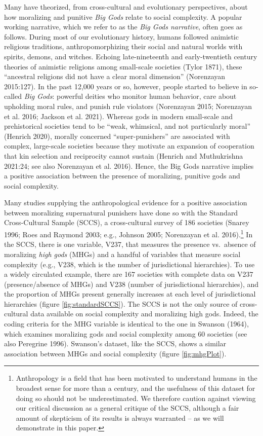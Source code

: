 \documentclass[
]{article}
\begin{document}
Many have theorized, from cross-cultural and evolutionary perspectives, about how moralizing and punitive \emph{Big Gods} relate to social complexity. A popular working narrative, which we refer to as the \emph{Big Gods narrative}, often goes as follows. During most of our evolutionary history, humans followed animistic religious traditions, anthropomorphizing their social and natural worlds with spirits, demons, and witches. Echoing late-nineteenth and early-twentieth century theories of animistic religions among small-scale societies (Tylor 1871), these ``ancestral religions did not have a clear moral dimension'' (Norenzayan 2015:127). In the past 12,000 years or so, however, people started to believe in so-called \emph{Big Gods}: powerful deities who monitor human behavior, care about upholding moral rules, and punish rule violators (Norenzayan 2015; Norenzayan et al. 2016; Jackson et al. 2021). Whereas gods in modern small-scale and prehistorical societies tend to be ``weak, whimsical, and not particularly moral'' (Henrich 2020), morally concerned ``super-punishers'' are associated with complex, large-scale societies because they motivate an expansion of cooperation that kin selection and reciprocity cannot sustain (Henrich and Muthukrishna 2021:24; see also Norenzayan et al. 2016). Hence, the Big Gods narrative implies a positive association between the presence of moralizing, punitive gods and social complexity.

Many studies supplying the anthropological evidence for a positive association between moralizing supernatural punishers have done so with the Standard Cross-Cultural Sample (SCCS), a cross-cultural survey of 186 societies (Snarey 1996; Roes and Raymond 2003; e.g., Johnson 2005; Norenzayan et al. 2016).\footnote{Anthropology is a field that has been motivated to understand humans in the broadest sense for more than a century, and the usefulness of this dataset for doing so should not be underestimated. We therefore caution against viewing our critical discussion as a general critique of the SCCS, although a fair amount of skepticism of its results is always warranted -- as we will demonstrate in this paper.} In the SCCS, there is one variable, V237, that measures the presence vs.~absence of moralizing \emph{high gods} (MHGs) and a handful of variables that measure social complexity (e.g., V238, which is the number of jurisdictional hierarchies). To use a widely circulated example, there are 167 societies with complete data on V237 (presence/absence of MHGs) and V238 (number of jurisdictional hierarchies), and the proportion of MHGs present generally increases at each level of jurisdictional hierarchies (figure \ref{fig:standardSCCS}). The SCCS is not the only source of cross-cultural data available on social complexity and moralizing high gods. Indeed, the coding criteria for the MHG variable is identical to the one in Swanson (1964), which examines moralizing gods and social complexity among 60 societies (see also Peregrine 1996). Swanson's dataset, like the SCCS, shows a similar association between MHGs and social complexity (figure \ref{fig:mhgPlot}).
\end{document}
